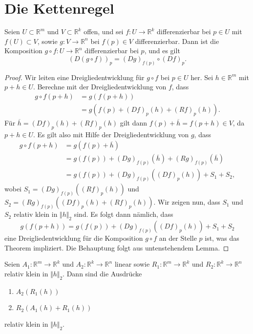 \documentclass[../main.tex]{subfiles}
\begin{document}
\section{Die Kettenregel}
\begin{theorem*}[Kettenregel]
  Seien $U \subset \mathbb{R}^m$ und $V \subset \mathbb{R}^k$
  offen, und sei $f \colon U \to \mathbb{R}^k$ differenzierbar
  bei $p \in U$ mit $f(U) \subset V$,
  sowie $g \colon V \to \mathbb{R}^n$ bei $f(p) \in V$
  differenzierbar.
  Dann ist die Komposition $g \circ f \colon U \to \mathbb{R}^n$
  differenzierbar bei $p$, und es gilt
  \[
    {(D(g \circ f))}_p = {(Dg)}_{f(p)} \circ {(Df)}_p.
  \]
\end{theorem*}

\begin{proof}
  Wir leiten eine Dreigliedentwicklung
  für $g \circ f$ bei $p \in U$ her.
  Sei $h \in \mathbb{R}^m$ mit $p + h \in U$.
  Berechne mit der Dreigliedentwicklung von $f$, dass
  \begin{align*}
    g \circ f ( p + h)
    & = g ( f ( p + h ))\\
    &= g(f(p) + {(Df)}_p(h) + {(Rf)}_p(h)).
  \end{align*}
  Für $\overline h = {(Df)}_p(h) + {(Rf)}_p(h)$ gilt dann
  $f(p) + \overline h = f(p+h) \in V$, da $p + h \in U$.
  Es gilt also mit Hilfe der Dreigliedentwicklung von $g$, dass
  \begin{align*}
    g \circ f(p+h)
    & = g(f(p) + \overline h) \\
    &= g(f(p)) + {(Dg)}_{f(p)}(\overline h) + {(Rg)}_{f(p)}(\overline h) \\
    &= g(f(p)) + {(Dg)}_{f(p)}({(Df)}_p(h)) + S_1 + S_2,
  \end{align*}
  wobei $S_1 = {(Dg)}_{f(p)}({(Rf)}_p(h))$ und
  $S_2 = {(Rg)}_{f(p)}({(Df)}_p(h) + {(Rf)}_p(h))$.
  Wir zeigen nun, dass $S_1$ und $S_2$ relativ klein
  in $\Vert h \Vert_2$ sind.
  Es folgt dann nämlich, dass
  \[
    g(f(p + h)) = g(f(p)) + {(Dg)}_{f(p)}({(Df)}_p(h)) + S_1 + S_2
  \]
  eine Dreigliedentwicklung für die Komposition
  $g \circ f$ an der Stelle $p$ ist,
  was das Theorem impliziert.
  Die Behauptung folgt aus untenstehendem Lemma.
\end{proof}

\begin{lemma*}
  Seien $A_1 \colon \mathbb{R}^m \to \mathbb{R}^k$
  und $A_2 \colon \mathbb{R}^k \to \mathbb{R}^n$ linear
  sowie $R_1 \colon \mathbb{R}^m \to \mathbb{R}^k$
  und $R_2 \colon \mathbb{R}^k \to \mathbb{R}^n$
  relativ klein in $\Vert h \Vert_2$.
  Dann sind die Ausdrücke
  \begin{enumerate}[\normalfont(i)]
    \item $A_2(R_1(h))$
    \item $R_2(A_1(h) + R_1(h))$
  \end{enumerate}
  relativ klein in $\Vert h \Vert_2$.
\end{lemma*}
\end{document}
